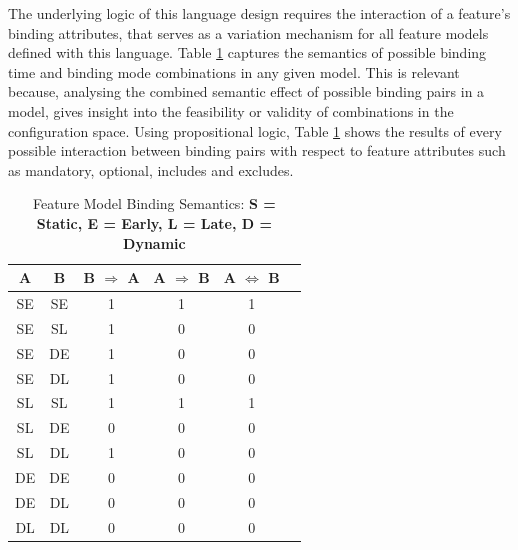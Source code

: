 \documentclass[conference]{IEEEtran}
\begin{document}
The underlying logic of this language design requires the interaction of a feature's binding attributes, that serves as a variation mechanism for all feature models defined with this language. Table \ref{tab:timoconf} captures the semantics of possible binding time and binding mode combinations in any given model. This is relevant because, analysing the combined semantic effect of possible binding pairs in a model, gives insight into the feasibility or validity of combinations in the configuration space. Using propositional logic, Table \ref{tab:timoconf} shows the results of every possible interaction between binding pairs with respect to feature attributes such as mandatory, optional, includes and excludes. 

\begin{table}[H]
\caption{Feature Model Binding Semantics: \textbf{S = Static, E = Early, L = Late, D = Dynamic}}
\begin{center}
\begin{tabular}{|c|c|c|c|c|c|}
\hline
    A & B & B $ \Rightarrow $ A & A $ \Rightarrow $ B & A $ \Leftrightarrow $ B \\\hline
         SE & SE & 1 & 1 & 1  \\ \hline
         SE & SL & 1 & 0 & 0  \\ \hline
         SE & DE & 1 & 0 & 0 \\ \hline
         SE & DL & 1 & 0 & 0 \\ \hline
          
         SL & SL & 1 & 1 & 1 \\ \hline
         SL & DE & 0 & 0 & 0 \\ \hline
         SL & DL & 1 & 0 & 0 \\ \hline
         
         DE & DE & 0 & 0 & 0 \\ \hline
         DE & DL & 0 & 0 & 0 \\ \hline
         
         DL & DL & 0 & 0 & 0 \\ \hline
         
\end{tabular}
\label{tab:timoconf}
\end{center}
\end{table}
\end{document}
